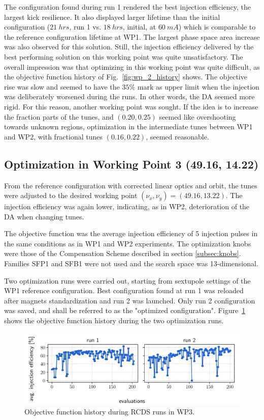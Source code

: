 The configuration found during run 1 rendered the best injection efficiency, the largest kick resilience. It also displayed larger lifetime than the initial configuration ($21~\unit{hrs}$, run 1 vs. $18~\unit{hrs}$, initial, at $60~\unit{mA}$) which is comparable to the reference configuration lifetime at WP1. The largest phase space area increase was also observed for this solution. Still, the injection efficiency delivered by the best performing solution on this working point was quite unsatisfactory. The overall impression was that optimizing in this working point was quite difficult, as the objective function history of Fig.~\ref{fig:wp_2_history} shows. The objective rise was slow and seemed to have the $35\%$ mark as upper limit when the injection was deliberately worsened during the runs. In other words, the DA seemed more rigid. For this reason, another working point was sought. If the idea is to increase the fraction parts of the tunes, and $(0.20, 0.25)$ seemed like overshooting towards unknown regions, optimization in the intermediate tunes between WP1 and WP2, with fractional tunes $(0.16, 0.22)$, seemed reasonable.
\subsection{Optimization in Working Point 3 (49.16, 14.22)}
From the reference configuration with corrected linear optics and orbit, the tunes were adjusted to the desired working point $(\nu_x, \nu_y)=(49.16, 13.22)$. The injection efficiency was again lower, indicating, as in WP2, deterioration of the DA when changing tunes.

The objective function was the average injection efficiency of 5 injection pulses in the same conditions as in WP1 and WP2 experiments. The optimization knobs were those of the Compensation Scheme described in section \ref{subsec:knobs}. Families SFP1 and SFB1 were not used and the search space was 13-dimensional.

Two optimization runs were carried out, starting from sextupole settings of the WP1 reference configuration. Best configuration found at run 1 was reloaded after magnets standardization and run 2 was launched. Only run 2 configuration was saved, and shall be referred to as the "optimized configuration". Figure~\ref{fig:wp3_history} shows the objective function history during the two optimization runs.
\begin{figure}[htb]
    \centering
    \includegraphics[width=\columnwidth]{Images/wp3_objfunc_hist.pdf}
    \caption[Objective function history during RCDS runs in WP3.]{Objective function history during RCDS runs in WP3.}
    \label{fig:wp3_history}
\end{figure}
